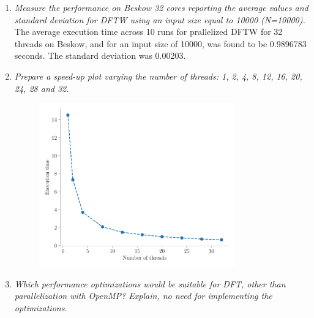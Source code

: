 \documentclass[12pt]{article}
\begin{document}
\begin{enumerate}
    \item \textit{Measure the performance on Beskow 32 cores reporting the average values and standard deviation for DFTW using an input size equal to 10000 (N=10000).}\\
    The average execution time across 10 runs for prallelized DFTW for 32 threads on Beskow, and for an input size of 10000, was found to be 0.9896783 seconds. The standard deviation was 0.00203.
    
    \item \textit{Prepare a speed-up plot varying the number of threads: 1, 2, 4, 8, 12, 16, 20, 24, 28 and 32.}
    \begin{figure}[H]
    \centering
	\includegraphics[width=0.8\textwidth]{dftw.pdf}
	\end{figure}
    
    \item \textit{Which performance optimizations would be suitable for DFT, other than parallelization with OpenMP? Explain, no need for implementing the optimizations.}
\end{enumerate}
\end{document}
